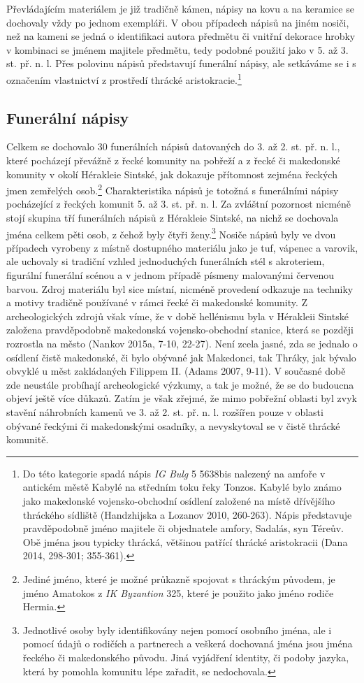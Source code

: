 Převládajícím materiálem je již tradičně kámen, nápisy na kovu a na keramice se dochovaly vždy po jednom exempláři. V obou případech nápisů na jiném nosiči, než na kameni se jedná o identifikaci autora předmětu či vnitřní dekorace hrobky v kombinaci se jménem majitele předmětu, tedy podobné použití jako v 5. až 3. st. př. n. l. Přes polovinu nápisů představují funerální nápisy, ale setkáváme se i s označením vlastnictví z prostředí thrácké aristokracie.\footnote{Do této kategorie spadá nápis {\em IG Bulg} 5 5638bis nalezený na amfoře v antickém městě Kabylé na středním toku řeky Tonzos. Kabylé bylo známo jako makedonské vojensko-obchodní osídlení založené na místě dřívějšího thráckého sídliště (Handzhijska a Lozanov 2010, 260-263). Nápis představuje pravděpodobně jméno majitele či objednatele amfory, Sadalás, syn Téreův. Obě jména jsou typicky thrácká, většinou patřící thrácké aristokracii (Dana 2014, 298-301; 355-361).}

\subsection[funerální-nápisy-6]{Funerální nápisy}

Celkem se dochovalo 30 funerálních nápisů datovaných do 3. až 2. st. př. n. l., které pocházejí převážně z řecké komunity na pobřeží a z řecké či makedonské komunity v okolí Hérakleie Sintské, jak dokazuje přítomnost zejména řeckých jmen zemřelých osob.\footnote{Jediné jméno, které je možné průkazně spojovat s thráckým původem, je jméno Amatokos z {\em IK Byzantion} 325, které je použito jako jméno rodiče Hermia.} Charakteristika nápisů je totožná s funerálními nápisy pocházející z řeckých komunit 5. až 3. st. př. n. l. Za zvláštní pozornost nicméně stojí skupina tří funerálních nápisů z Hérakleie Sintské, na nichž se dochovala jména celkem pěti osob, z čehož byly čtyři ženy.\footnote{Jednotlivé osoby byly identifikovány nejen pomocí osobního jména, ale i pomocí údajů o rodičích a partnerech a veškerá dochovaná jména jsou jména řeckého či makedonského původu. Jiná vyjádření identity, či podoby jazyka, která by pomohla komunitu lépe zařadit, se nedochovala.} Nosiče nápisů byly ve dvou případech vyrobeny z místně dostupného materiálu jako je tuf, vápenec a varovik, ale uchovaly si tradiční vzhled jednoduchých funerálních stél s akroteriem, figurální funerální scénou a v jednom případě písmeny malovanými červenou barvou. Zdroj materiálu byl sice místní, nicméně provedení odkazuje na techniky a motivy tradičně používané v rámci řecké či makedonské komunity. Z archeologických zdrojů však víme, že v době hellénismu byla v Hérakleii Sintské založena pravděpodobně makedonská vojensko-obchodní stanice, která se později rozrostla na město (Nankov 2015a, 7-10, 22-27). Není zcela jasné, zda se jednalo o osídlení čistě makedonské, či bylo obývané jak Makedonci, tak Thráky, jak bývalo obvyklé u měst zakládaných Filippem II. (Adams 2007, 9-11). V současné době zde neustále probíhají archeologické výzkumy, a tak je možné, že se do budoucna objeví ještě více důkazů. Zatím je však zřejmé, že mimo pobřežní oblasti byl zvyk stavění náhrobních kamenů ve 3. až 2. st. př. n. l. rozšířen pouze v oblasti obývané řeckými či makedonskými osadníky, a nevyskytoval se v čistě thrácké komunitě.

